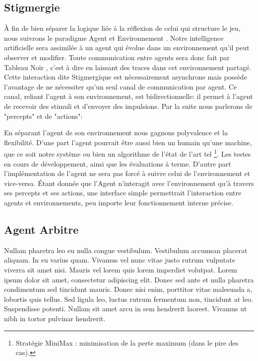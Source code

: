 \subsection{ \og Stigmergie \fg{} }

À fin de bien séparer la logique liée à la réflexion de celui qui structure le jeu, nous suivrons le paradigme \og Agent et Environnement \fg{}. Notre intelligence artificielle sera assimilée à un agent qui évolue dans un environnement qu'il peut observer et modifier. 
Toute communication entre agents sera donc fait par \og Tableau Noir \fg{}, c'est à dire en laissant des traces dans cet environnement partagé. Cette interaction dite \og Stigmergique \fg{} est nécessairement asynchrone mais possède l'avantage de ne nécessiter qu'un seul canal de communication par agent.
Ce canal, reliant l'agent à son environnement, est bidirectionnelle: il permet à l'agent de recevoir des stimuli et d'envoyer des impulsions. Par la suite nous parlerons de "percepts" et de "actions":


En séparant l'agent de son environnement nous gagnons polyvalence et la flexibilité. D'une part l'agent pourrait être aussi bien un humain qu'une machine, que ce soit notre système ou bien un algorithme de l'état de l'art tel \footnote{Stratégie MiniMax : minimisation de la perte maximum (dans le pire des cas).}. Les testes en cours de développement, ainsi que les évaluations à terme.
D'autre part l'implémentation de l'agent ne sera pas forcé à suivre celui de l'environnement et vice-versa. Étant donnée que l'Agent n'interagit avec l'environnement qu'à travers ses percepts et ses actions, une interface simple permettrait l'interaction entre agents et environnements, peu importe leur fonctionnement interne précise.

\subsection{ Agent \og Arbitre \fg{} }

Nullam pharetra leo eu nulla congue vestibulum. Vestibulum accumsan placerat aliquam. In eu varius quam. Vivamus vel nunc vitae justo rutrum vulputate viverra sit amet nisi. Mauris vel lorem quis lorem imperdiet volutpat. Lorem ipsum dolor sit amet, consectetur adipiscing elit. Donec sed ante et nulla pharetra condimentum sed tincidunt mauris. Donec nisi enim, porttitor vitae malesuada a, lobortis quis tellus. Sed ligula leo, luctus rutrum fermentum non, tincidunt at leo. Suspendisse potenti. Nullam sit amet arcu in sem hendrerit laoreet. Vivamus ut nibh in tortor pulvinar hendrerit. 
